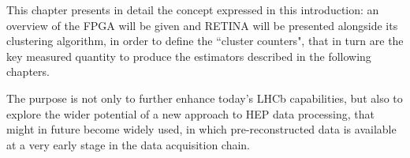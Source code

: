 This chapter presents in detail the concept expressed in this introduction: an overview of the FPGA will be given and RETINA will be presented alongside its clustering algorithm, in order to define the ``cluster counters", that in turn are the key measured quantity to produce the estimators described in the following chapters.

The purpose is not only to further enhance today's LHCb capabilities, but also to explore the wider potential of a new approach to HEP data processing, that might in future become widely used, in which pre-reconstructed data is available at a very early stage in the data acquisition chain. 


